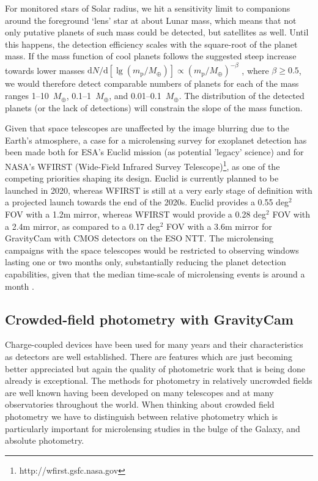 \documentclass{pasa}%
\begin{document}
For monitored stars of Solar radius, we hit a sensitivity limit to companions around the foreground `lens' star at about Lunar mass, which means that not only putative planets of such mass could be detected, but satellites as well. Until this happens, the detection efficiency scales with the square-root of the planet mass. If the mass function of cool planets follows the suggested steep increase towards lower masses $\mathrm{d}N/\mathrm{d}[\lg(m_\mathrm{p}/M_\oplus)] \propto (m_\mathrm{p}/M_\oplus)^{-\beta}$ \citep{Cassan+2012}, where $\beta \ge 0.5$, we would therefore detect comparable numbers of planets for each of the mass ranges 1--10~$M_\oplus$, 0.1--1~$M_\oplus$, and 0.01--0.1~$M_\oplus$. The distribution of the detected planets (or the lack of detections) will constrain the slope of the mass function.
 
Given that space telescopes are unaffected by the image blurring due to the Earth's atmosphere, a case for a microlensing survey for exoplanet detection has been made both for ESA's Euclid mission (as potential 'legacy' science) and for NASA's WFIRST (Wide-Field Infrared Survey Telescope)\footnote{http://wfirst.gsfc.nasa.gov}, as one of the competing priorities shaping its design. Euclid is currently planned to be launched in 2020, whereas WFIRST is still at a very early stage of definition with a projected launch towards the end of the 2020s. Euclid provides a 0.55 deg$^2$ FOV with a 1.2m mirror, whereas WFIRST would provide a 0.28 deg$^2$ FOV with a 2.4m mirror, as compared to a 0.17 deg$^2$ FOV with a 3.6m mirror for GravityCam with CMOS detectors on the ESO NTT. The microlensing campaigns with the space telescopes would be restricted to observing windows lasting one or two months only, substantially reducing the planet detection capabilities, given that the median time-scale of microlensing events is around a month \citep{Penny+2013,WFIRST:micro}.




\subsection{Crowded-field photometry with GravityCam}

Charge-coupled devices have been used for many years and their characteristics as detectors are well established. There are features which are just becoming better appreciated but again the quality of photometric work that is being done already is exceptional. The methods for photometry in relatively uncrowded fields are well known having been developed on many telescopes and at many observatories throughout the  world. When thinking about crowded field photometry we have to distinguish between relative photometry which is particularly important for microlensing studies in the bulge of the Galaxy, and absolute photometry.
\end{document}
